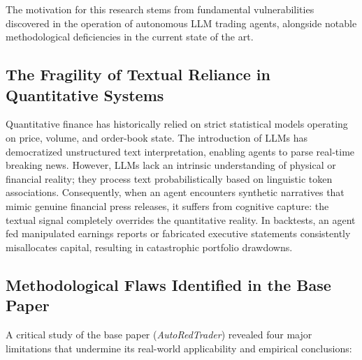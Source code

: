 \documentclass[11pt,a4paper]{article}
\begin{document}
The motivation for this research stems from fundamental vulnerabilities discovered in the operation of autonomous LLM trading agents, alongside notable methodological deficiencies in the current state of the art.

\subsection{The Fragility of Textual Reliance in Quantitative Systems}
Quantitative finance has historically relied on strict statistical models operating on price, volume, and order-book state. The introduction of LLMs has democratized unstructured text interpretation, enabling agents to parse real-time breaking news. However, LLMs lack an intrinsic understanding of physical or financial reality; they process text probabilistically based on linguistic token associations. Consequently, when an agent encounters synthetic narratives that mimic genuine financial press releases, it suffers from cognitive capture: the textual signal completely overrides the quantitative reality. In backtests, an agent fed manipulated earnings reports or fabricated executive statements consistently misallocates capital, resulting in catastrophic portfolio drawdowns.

\subsection{Methodological Flaws Identified in the Base Paper}
A critical study of the base paper (\textit{AutoRedTrader}) revealed four major limitations that undermine its real-world applicability and empirical conclusions:
\end{document}
